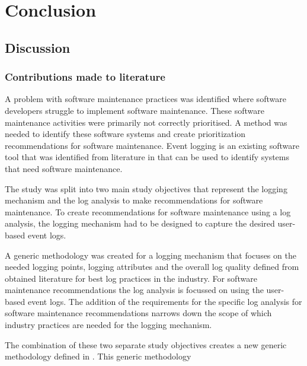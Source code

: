 \chapter{Conclusion}
\label{chap:4}

\section{Discussion}

\subsection{Contributions made to literature}
A problem with software maintenance practices was identified where software developers struggle to implement software maintenance. These software maintenance activities were primarily not correctly prioritised. A method was needed to identify these software systems and create prioritization recommendations for software maintenance. Event logging is an existing software tool that was identified from literature in  that can be used to identify systems that need software maintenance. \par The study was split into two main study objectives that represent the logging mechanism and the log analysis to make recommendations for software maintenance. To create recommendations for software maintenance using a log analysis, the logging mechanism had to be designed to capture the desired user-based event logs. \par A generic methodology was created for a logging mechanism that focuses on the needed logging points, logging attributes and the overall log quality defined from obtained literature for best log practices in the industry. For software maintenance recommendations the log analysis is focussed on using the user-based event logs. The addition of the requirements for the specific log analysis for software maintenance recommendations narrows down the scope of which industry practices are needed for the logging mechanism.\par The combination of these two separate study objectives creates a new generic methodology defined in . This generic methodology 

